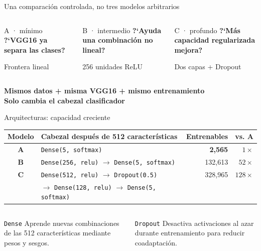 \documentclass[aspectratio=169,11pt]{beamer}
\begin{document}
\begin{frame}{Una comparación controlada, no tres modelos arbitrarios}
\begin{columns}[T,onlytextwidth]
\begin{block}{A · mínimo}
\centering\Large\bfseries ?`VGG16 ya separa las clases?\par
\vspace{.35cm}\normalsize Frontera lineal
\end{block}
\begin{block}{B · intermedio}
\centering\Large\bfseries ?`Ayuda una combinación no lineal?\par
\vspace{.35cm}\normalsize 256 unidades ReLU
\end{block}
\begin{block}{C · profundo}
\centering\Large\bfseries ?`Más capacidad regularizada mejora?\par
\vspace{.35cm}\normalsize Dos capas + Dropout
\end{block}
\end{columns}
\vfill
\centering
\color{AzulNoche}\large\bfseries Mismos datos + misma VGG16 + mismo entrenamiento\\
\color{Cian}\normalsize Solo cambia el cabezal clasificador
\end{frame}

\begin{frame}{Arquitecturas: capacidad creciente}
\centering
\small
\begin{tabular}{@{}clrr@{}}
\toprule
\textbf{Modelo} & \textbf{Cabezal después de 512 características} & \textbf{Entrenables} & \textbf{vs. A}\\
\midrule
\color{Verde}\bfseries A & \texttt{Dense(5, softmax)} & \textbf{2,565} & $1\times$\\
\addlinespace
\color{Azul}\bfseries B & \texttt{Dense(256, relu)} $\rightarrow$ \texttt{Dense(5, softmax)} & 132,613 & $52\times$\\
\addlinespace
\color{Rojo}\bfseries C & \texttt{Dense(512, relu)} $\rightarrow$ \texttt{Dropout(0.5)} & 328,965 & $128\times$\\
& $\rightarrow$ \texttt{Dense(128, relu)} $\rightarrow$ \texttt{Dense(5, softmax)} &&\\
\bottomrule
\end{tabular}
\vspace{.55cm}
\begin{columns}[T,onlytextwidth]
\begin{block}{\texttt{Dense}}
Aprende nuevas combinaciones de las 512 características mediante pesos y sesgos.
\end{block}
\begin{block}{\texttt{Dropout}}
Desactiva activaciones al azar durante entrenamiento para reducir coadaptación.
\end{block}
\end{columns}
\end{frame}
\end{document}
